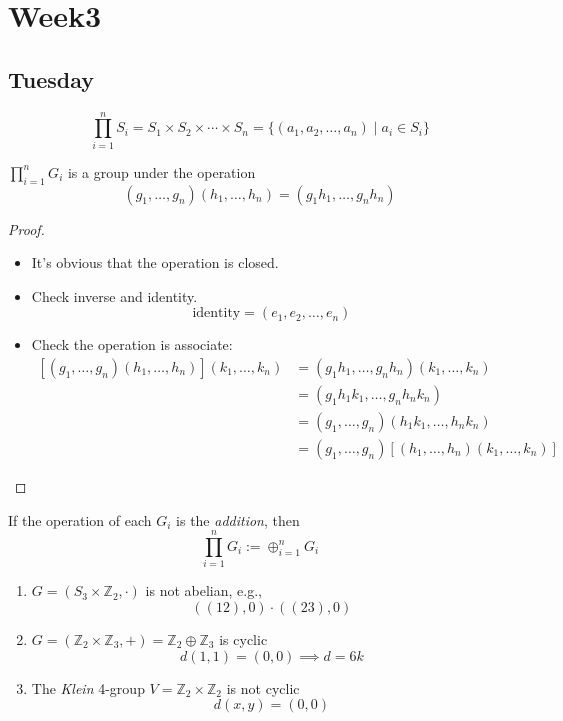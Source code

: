 
\chapter{Week3}


\section{Tuesday}
\begin{definition}
\[
\prod_{i=1}^nS_i=S_1\times S_2\times\cdots\times S_n
=
\{
(a_1,a_2,\dots,a_n)\mid a_i\in S_i
\}
\]
\end{definition}
\begin{theorem}
$\prod_{i=1}^nG_i$ is a group under the operation
\[
(g_1,\dots,g_n)(h_1,\dots,h_n)=(g_1h_1,\dots,g_nh_n)
\]
\end{theorem}
\begin{proof}
\begin{itemize}
\item
It's obvious that the operation is closed.
\item
Check inverse and identity.
\[
\mbox{identity} = (e_1,e_2,\dots,e_n)
\]
\item
Check the operation is associate:
\begin{align*}
\left[(g_1,\dots,g_n)(h_1,\dots,h_n)\right](k_1,\dots,k_n)&=(g_1h_1,\dots,g_nh_n)(k_1,\dots,k_n)\\
&=(g_1h_1k_1,\dots,g_nh_nk_n)\\
&=(g_1,\dots,g_n)(h_1k_1,\dots,h_nk_n)\\
&=(g_1,\dots,g_n)\left[(h_1,\dots,h_n)(k_1,\dots,k_n)\right]
\end{align*}
\end{itemize}
\end{proof}
\begin{remark}
If the operation of each $G_i$ is the \emph{addition}, then 
\[
\prod_{i=1}^nG_i:=\oplus_{i=1}^nG_i
\]
\end{remark}
\begin{example}
\begin{enumerate}
\item
$G=(S_3\times\mathbb{Z}_2,\cdot)$ is not abelian, e.g.,
\[
((12),0)\cdot((23),0)
\]
\item
$G=(\mathbb{Z}_2\times\mathbb{Z}_3,+)=\mathbb{Z}_2\oplus\mathbb{Z}_3$ is cyclic
\[
d(1,1) = (0,0)\implies d=6k
\]
\item
The \emph{Klein} 4-group $V=\mathbb{Z}_2\times\mathbb{Z}_2$ is not cyclic
\[
d(x,y) = (0,0)
\]
\end{enumerate}
\end{example}
